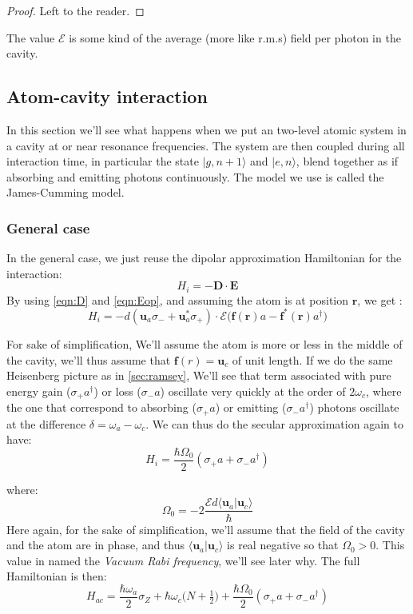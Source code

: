 \documentclass[10pt,a4paper]{report}
\theoremstyle{plain}
\theoremstyle{definition}
\theoremstyle{remark}
\newcommand{\TODO}{\textbf{TODO}}
\newcommand{\ket}[1]{|#1\rangle}
\newcommand{\braket}[2]{\langle#1|#2\rangle}
\newcommand{\bs}{\boldsymbol}
\begin{document}
\begin{proof} Left to the reader.
\end{proof}

The value $\mathcal{E}$ is some kind of the average (more like r.m.s) field per
photon in the cavity.

\subsection{Atom-cavity interaction}\label{sec:atomcav}


In this section we'll see what happens when we put an two-level atomic system in
a cavity at or near resonance frequencies. The system are then coupled during
all interaction time, in particular the state $\ket{g,n+1}$ and $\ket{e,n}$,
blend together as if absorbing and emitting photons continuously. The model we
use is called the James-Cumming model.

\subsubsection{General case}

In the general case, we just reuse the dipolar approximation Hamiltonian for the
interaction:
\[H_i = - \bs D \cdot \bs E\]
By using \cref{eqn:D} and \cref{eqn:Eop}, and assuming the atom is at
position $\bs r$, we get :
\[H_i = - d(\bs u_a \sigma_- + \bs u_a^* \sigma_+) \cdot \mathcal{E}\big(\bs
  f(\bs r) a - \bs f^*(\bs r)
  a^\dagger \big)
  \]


For sake of simplification, We'll assume the atom is more or less in the middle
of the cavity, we'll thus assume that $\bs f(r) = \bs u_c$ of unit length.
If we do the same Heisenberg picture as in \cref{sec:ramsey}, We'll see that
term associated with pure energy gain ($\sigma_+a^\dagger$) or loss ($\sigma_-a$)
oscillate very quickly at the order of $2\omega_c$,
where the one that correspond to absorbing ($\sigma_+a$) or emitting
($\sigma_-a^\dagger$) photons oscillate at the difference $\delta = \omega_a -
\omega_c$. We can
thus do the secular approximation again to have:
\begin{equation}
  H_i = \frac{\hbar \Omega_0}2 (\sigma_+a + \sigma_-a^\dagger)
\end{equation}

where:
\[\Omega_0 = -2\frac {\mathcal{E}d \braket{\bs u_a}{\bs u_c}}{\hbar}\]
Here again, for the sake of simplification, we'll assume that the field of the
cavity and the atom are in phase, and thus $\braket{\bs u_a}{\bs u_c}$ is real
negative so that $\Omega_0 > 0$. This value in named the \emph{Vacuum Rabi
  frequency}, we'll see later why. The full Hamiltonian is then:
\begin{equation}
H_{ac} = \frac{\hbar \omega_a}2 \sigma_Z + \hbar \omega_c \big(N +
  \tfrac12\big) + \frac{\hbar \Omega_0}2 (\sigma_+a + \sigma_-a^\dagger)
\end{equation}
\end{document}
